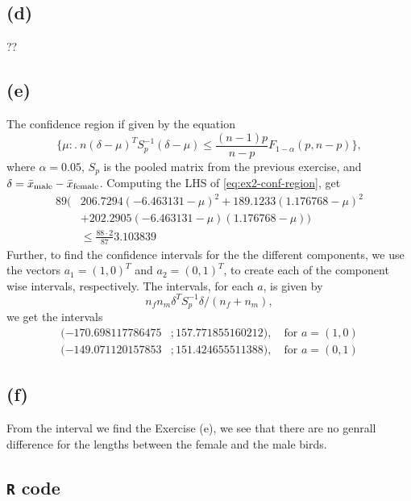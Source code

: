 \subsection*{(d)}
\label{sec:d}
??

\subsection*{(e)}
\label{sec:e}

The confidence region if given by the equation
\begin{equation}
  \label{eq:ex2-conf-region}
 \{\mu:.\ n (\delta - \mu)^T S_p^{-1} (\delta-\mu)\leq \frac{(n-1)p}{n-p}F_{1-\alpha}(p,n-p)\},
\end{equation}
where $\alpha = 0.05$, $S_p$ is the pooled matrix from the previous
exercise, and $\delta = \bar{x}_{\rm male}  - \bar{x}_{\rm
  female}$. Computing the LHS of \eqref{eq:ex2-conf-region}, get
\begin{align*}
  89
  \big(
    &206.7294 ( - 6.463131 -\mu)^2 + 189.1233(1.176768 -\mu)^2 \\
    &+ 202.2905(- 6.463131 - \mu)(1.176768- \mu)
  \big)\\
  &\leq \frac{88\cdot 2}{87}3.103839
\end{align*}
Further, to find the confidence intervals for the the different
components, we use the vectors $a_1 = (1,0)^T$ and $a_2 = (0,1)^T$, to
create each of the component wise intervals, respectively. The
intervals, for each $a$, is given by 
\begin{equation*}
  n_f n_m \delta^T S_p^{-1} \delta / (n_f + n_m) , 
\end{equation*}
we get the intervals
\begin{align*}
  (-170.698117786475&; 157.771855160212), \quad \text{for } a = (1,0)
  \\
  (-149.071120157853&;151.424655511388), \quad \text{for } a = (0,1)
\end{align*}

\subsection*{(f)}
\label{sec:f}

From the interval we find the Exercise (e), we see that there are no
genrall difference for the lengths between the female and the male birds.
\subsection*{\texttt{R} code}
\label{sec:textttr-code}



